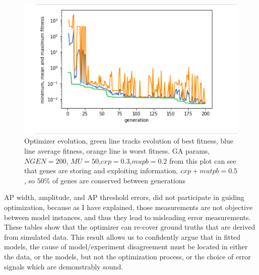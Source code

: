 \begin{figure}
    \centering
    \includegraphics[scale=0.7]{figures/optimizer_internal_validation}
    \caption{Optimizer evolution, green line tracks evolution of best fitness, blue line average fitness, orange line is worst fitness. GA params, $NGEN=200$, $MU=50$,$cxp=0.3$,$mupb=0.2$ from this plot can see that genes are storing and exploiting information, $cxp+mutpb=0.5$, so $50\%$ of genes are conserved between generations }
    \label{fig:my_label}
\end{figure}


\begin{table}[ht]
\centering
{}
\end{table}

AP width, amplitude, and AP threshold errors, did not participate in guiding optimization, because as I have explained, those measurements are not objective between model instances, and thus they lead to misleading error measurements. These tables show that the optimizer can re-cover ground truths that are derived from simulated data. This result allows us to confidently argue that in fitted models, the cause of model/experiment disagreement must be located in either the data, or the models, but not the optimization process, or the choice of error signals which are demonstrably sound.

